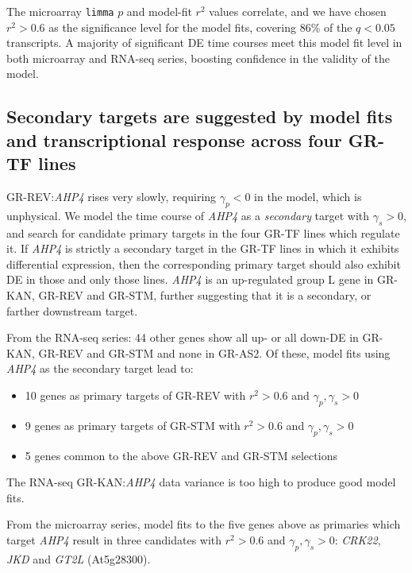 \documentclass[aspb,landscape]{a0poster}
\begin{document}
\begin{multicols}{3}
  The microarray \texttt{limma} $p$ and model-fit $r^2$ values correlate, and we have chosen $r^2>0.6$ as the significance
  level for the model fits, covering 86\% of the $q<0.05$ transcripts. A majority of significant DE time courses meet
  this model fit level in both microarray and RNA-seq series, boosting confidence in the validity of the model.

  \subsection*{Secondary targets are suggested by model fits and transcriptional response across four GR-TF lines}

  GR-REV:\textit{AHP4} rises very slowly, requiring $\gamma_p<0$ in the model, which is unphysical.
  We model the time course of \textit{AHP4} as a \textit{secondary} target with $\gamma_s>0$, and search for candidate primary targets in the four GR-TF lines which regulate it.
  If \textit{AHP4} is strictly a secondary target in the GR-TF lines in which it exhibits differential expression,
  then the corresponding primary target should also exhibit DE in those and only those lines. \textit{AHP4} is an up-regulated group L gene in GR-KAN, GR-REV and GR-STM, further suggesting that it is a secondary,
  or farther downstream target.
    
  From the RNA-seq series: 44 other genes show all up- or all down-DE in GR-KAN, GR-REV and GR-STM and none in GR-AS2.
  Of these, model fits using \textit{AHP4} as the secondary target lead to:
  \begin{itemize}
  \item 10 genes as primary targets of GR-REV with $r^2>0.6$ and $\gamma_p,\gamma_s>0$
  \item 9 genes as primary targets of GR-STM with $r^2>0.6$ and $\gamma_p,\gamma_s>0$
  \item 5 genes common to the above GR-REV and GR-STM selections
  \end{itemize}
  The RNA-seq GR-KAN:\textit{AHP4} data variance is too high to produce good model fits.

  From the microarray series, model fits to the five genes above as primaries which target \textit{AHP4} result in
  three candidates with $r^2>0.6$ and $\gamma_p,\gamma_s>0$: \textit{CRK22}, \textit{JKD} and \textit{GT2L} (At5g28300).


\end{multicols}
\end{document}
